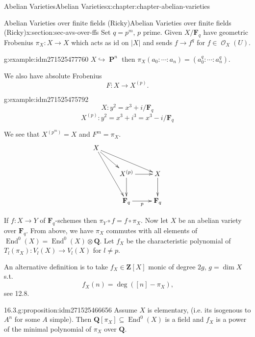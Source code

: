 \documentclass[oneside,10pt,]{book}
\numberwithin{equation}{section}
\newcommand{\sheaf}[1]{\operatorname{\mathcal{#1}}}
\newcommand{\lb}{[}
\newcommand{\rb}{]}
\newcommand{\ZZ}{\mathbf{Z}}
\newcommand{\QQ}{\mathbf{Q}}
\newcommand{\FF}{\mathbf{F}}
\newcommand{\id}{\mathrm{id}}
\DeclareMathOperator{\End}{End}
\DeclareMathOperator{\PP}{\mathbf{P}}
\begin{document}
\begin{chapterptx}{Abelian Varieties}{}{Abelian Varieties}{}{}{x:chapter:chapter-abelian-varieties}
%
%
\typeout{************************************************}
\typeout{************************************************}
%
\begin{sectionptx}{Abelian Varieties over finite fields (Ricky)}{}{Abelian Varieties over finite fields (Ricky)}{}{}{x:section:sec-avs-over-ffs}
Set \(q = p^m\), \(p\) prime. Given \(X/\FF_q\) have  geometric Frobenius \(\pi_X\colon X \to X\) which acts as \(\id\) on \(|X|\) and sends \(f\to f^q\) for \(f\in \sheaf O_X(U)\).%
\begin{example}{}{g:example:idm271525477760}%
\(X \hookrightarrow \PP^n\) then \(\pi_X(a_0:\cdots :a_n) = (a_0^q : \cdots :a_n^q)\).%
\end{example}
We also have absolute Frobenius%
\begin{equation*}
F\colon X\to X^{(p)}\text{.}
\end{equation*}
%
\begin{example}{}{g:example:idm271525475792}%
%
\begin{equation*}
X \colon y^2 = x^3 + i / \FF_q
\end{equation*}
%
\begin{equation*}
X^{(p)} \colon y^2 = x^3 + i^3 = x^3 - i / \FF_q
\end{equation*}
%
\end{example}
We see that \(X^{(p^m)} = X\) and \(F^m = \pi_X\).%
\begin{equation*}
\xymatrix{
X \ar[drr] \ar[dr]\ar[ddr] & &\\
& X^{(p)} \ar[d]\ar[r] & X\ar[d]\\
& \FF_q \ar[r]_p &\FF_q
}
\end{equation*}
%
\par
If \(f\colon X \to Y\) of \(\FF_q\)-schemes then \(\pi_Y \circ f = f\circ \pi_X\). Now let \(X\) be an abelian variety over \(\FF_q\). From above, we have \(\pi_X\) commutes with all elements of \(\End^0(X) = \End^0(X)\otimes \QQ\). Let \(f_X\) be the characteristic polynomial of \(T_l(\pi_X) \colon V_l(X) \to V_l(X)\) for \(l \ne p\).%
\par
An alternative definition is to take \(f_X\in \ZZ\lb X\rb\) monic of degree \(2g \), \(g = \dim X\) s.t.%
\begin{equation*}
f_X(n) = \deg([n] -\pi_X)\text{,}
\end{equation*}
see 12.8.%
\begin{proposition}{16.3.}{}{g:proposition:idm271525466656}%
Assume \(X\) is elementary, (i.e. its isogenous to \(A^n\) for some \(A\) simple). Then  \(\QQ\lb \pi_X\rb\subseteq \End^0(X)\) is a field and \(f_X\) is a power of the minimal polynomial of \(\pi_X\) over \(\QQ\).%

\end{proposition}
\end{sectionptx}
\end{chapterptx}
\end{document}
